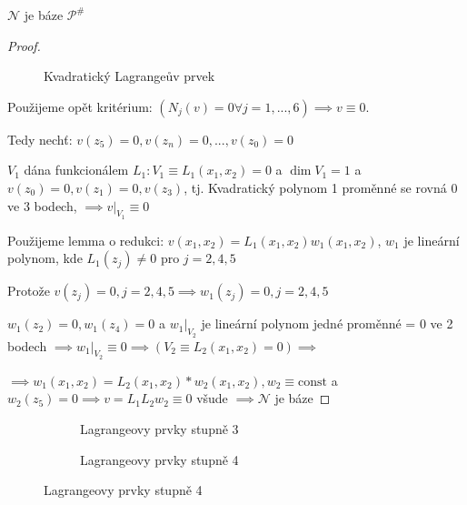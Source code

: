 \documentclass[../main.tex]{subfiles}
\begin{document}
\begin{claim}
    $\mathcal{N}$ je báze $\mathcal{P}^\#$
\end{claim}

\begin{proof}
    \begin{figure}[ht]
        \centering
        \caption{Kvadratický Lagrangeův prvek}
    \end{figure}
    

    Použijeme opět kritérium: $(N_j(v) = 0 \forall j = 1,...,6) \implies v \equiv 0$.
    
    Tedy nechť: $v(z_5)=0, v(z_n) = 0, ..., v(z_0) = 0$

    $V_1$ dána funkcionálem $L_1 : V_1 \equiv L_1(x_1,x_2) = 0$ a $\dim V_1 = 1$ a $v(z_0) =0, v(z_1) = 0, v(z_3)$, tj. Kvadratický polynom 1 proměnné se rovná 0 ve 3 bodech, $\implies v|_{V_1} \equiv 0$

    Použijeme lemma o redukci: $v(x_1,x_2) = L_1(x_1,x_2)w_1(x_1,x_2)$, $w_1$ je lineární polynom, kde $L_1(z_j)\neq0$ pro $j=2,4,5$

    Protože $v(z_j) = 0, j = 2,4,5 \implies w_1(z_j) = 0, j=2,4,5$

    $w_1(z_2) = 0, w_1(z_4) = 0$ a $w_1|_{V_2}$ je lineární polynom jedné proměnné = 0 ve 2 bodech $\implies w_1|_{V_2}\equiv0\implies(V_2\equiv L_2(x_1,x_2)=0)\implies$
    
    $\implies w_1(x_1,x_2) = L_2(x_1,x_2)*w_2(x_1,x_2), w_2 \equiv \text{const}$ a $w_2(z_5) = 0 \implies v = L_1L_2w_2 \equiv 0$ všude $\implies \mathcal{N}$ je báze


\end{proof}

\begin{remark}

    \begin{figure}[h]
        \centering
        \begin{subfigure}[t]{0.5\textwidth}
            \centering
            \caption{Lagrangeovy prvky stupně 3}
        \end{subfigure}
        \hfill
        \begin{subfigure}[t]{0.5\textwidth}
            \centering
            \caption{Lagrangeovy prvky stupně 4}
        \end{subfigure}
    \end{figure}

\end{remark}
\end{document}
